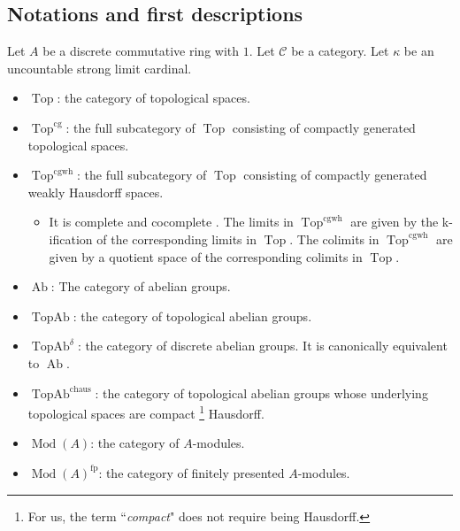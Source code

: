 \documentclass[11pt]{amsart}
\newcommand{\cC}{\mathcal{C}} %
\newcommand{\Ab}{\operatorname{\mathrm{Ab}}}
\newcommand{\Mod}{\operatorname{Mod}}
\newcommand{\Top}{\operatorname{Top}}
\newcommand{\cg}{\operatorname{cg}}
\newcommand{\cgwh}{\operatorname{cgwh}}
\newcommand{\chaus}{\operatorname{chaus}}
\newcommand{\TopAb}{\operatorname{TopAb}}
\newcommand{\fp}{\operatorname{{fp}}}
\theoremstyle{plain}
\theoremstyle{definition}
\numberwithin{equation}{prop}
\begin{document}
\subsection{Notations and first descriptions}
Let $A$ be a discrete commutative ring with $1$.
Let $\cC$ be a category. Let $\kappa$ be an uncountable strong limit cardinal.
\begin{itemize}
\item 
$\Top$: the category of topological spaces.
\item 
$\Top^{\cg}$: the full subcategory of $\Top$ consisting of compactly generated topological spaces.
\item 
$\Top^{\cgwh}$: the full subcategory of $\Top$ consisting of compactly generated weakly Hausdorff spaces.
\begin{itemize}
\item 
It is complete and cocomplete \cite[Corollary 2.23, Proposition 2.30]{Strickland_CGHW}.
The limits in $\Top^{\cgwh}$ are given by the k-ification of the corresponding limits in $\Top$.
The colimits in $\Top^{\cgwh}$ are given by a quotient space of the corresponding colimits in $\Top$.
\end{itemize}
\item 
$\Ab$: The category of abelian groups.
\item 
$\TopAb$: the category of topological abelian groups.
\item 
$\TopAb^\delta$: the category of discrete abelian groups.
It is canonically equivalent to $\Ab$.
\item 
$\TopAb^{\chaus}$: the category of topological abelian groups whose underlying topological spaces are compact 
\footnote{For us, the term ``\textit{compact}" does not require being Hausdorff.}
Hausdorff.
\item 
$\Mod(A)$: the category of $A$-modules.
\item 
$\Mod(A)^{\fp}$: the category of finitely presented $A$-modules.


\end{itemize}
\end{document}
